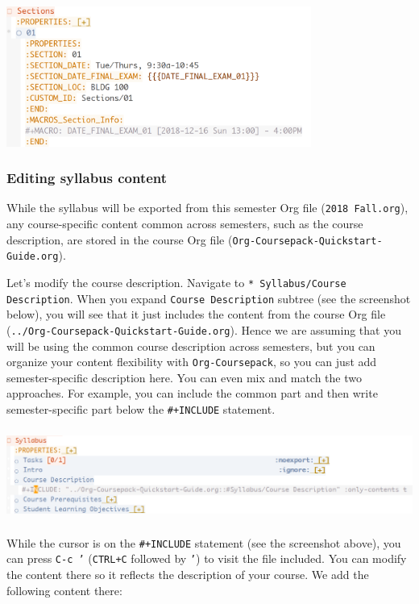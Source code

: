 \documentclass[10pt,article]{article}
\begin{document}
\begin{center}
\includegraphics[width=10cm]{../../../Assets/Images/Org-Teaching/Quickstart_Section-Information-Properties.png}
\end{center}
\subsubsection{Editing syllabus content}
\label{sec:org946ac97}
While the syllabus will be exported from this semester Org file (\texttt{2018
Fall.org}), any course-specific content common across semesters, such as the
course description, are stored in the course Org file
(\texttt{Org-Coursepack-Quickstart-Guide.org}).

Let's modify the course description. Navigate to \texttt{* Syllabus/Course
Description}. When you expand \texttt{Course Description} subtree (see the screenshot
below), you will see that it just includes the content from the course Org
file (\texttt{../Org-Coursepack-Quickstart-Guide.org}). Hence we are assuming that
you will be using the common course description across semesters, but you can
organize your content flexibility with \texttt{Org-Coursepack}, so you can just add
semester-specific description here. You can even mix and match the two
approaches. For example, you can include the common part and then write
semester-specific part below the \texttt{\#+INCLUDE} statement.

\begin{center}
\includegraphics[height=3cm]{../../../Assets/Images/Org-Teaching/Quickstart_Syllabus-Course-Description.png}
\end{center}

While the cursor is on the \texttt{\#+INCLUDE} statement (see the screenshot above),
you can press \texttt{C-c '} (\texttt{CTRL+C} followed by \texttt{'}) to visit the file
included. You can modify the content there so it reflects the description of
your course. We add the following content there:
\end{document}
